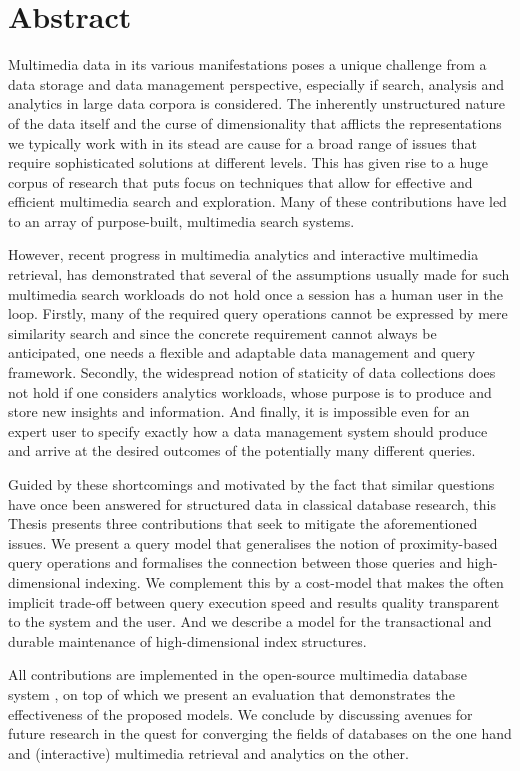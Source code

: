 
\chapter{Abstract}

Multimedia data in its various manifestations poses a unique challenge from a data storage and data management perspective, especially if search, analysis and analytics in large data corpora is considered. The inherently unstructured nature of the data itself and the curse of dimensionality that afflicts the representations we typically work with in its stead are cause for a broad range of issues that require sophisticated solutions at different levels. This has given rise to a huge corpus of research that puts focus on techniques that allow for effective and efficient multimedia search and exploration. Many of these contributions have led to an array of purpose-built, multimedia search systems.

However, recent progress in multimedia analytics and interactive multimedia retrieval, has demonstrated that several of the assumptions usually made for such multimedia search workloads do not hold once a session has a human user in the loop. Firstly, many of the required query operations cannot be expressed by mere similarity search and since the concrete requirement cannot always be anticipated, one needs a flexible and adaptable data management and query framework. Secondly, the widespread notion of staticity of data collections does not hold if one considers analytics workloads, whose purpose is to produce and store new insights and information. And finally, it is impossible even for an expert user to specify exactly how a data management system should produce and arrive at the desired outcomes of the potentially many different queries.

Guided by these shortcomings and motivated by the fact that similar questions have once been answered for structured data in classical database research, this Thesis presents three contributions that seek to mitigate the aforementioned issues. We present a query model that generalises the notion of proximity-based query operations and formalises the connection between those queries and high-dimensional indexing. We complement this by a cost-model that makes the often implicit trade-off between query execution speed and results quality transparent to the system and the user. And we describe a model for the transactional and durable maintenance of high-dimensional index structures.

All contributions are implemented in the open-source multimedia database system \cottontail{}, on top of which we present an evaluation that demonstrates the effectiveness of the proposed models. We conclude by discussing avenues for future research in the quest for converging the fields of databases on the one hand and (interactive) multimedia retrieval and analytics on the other.